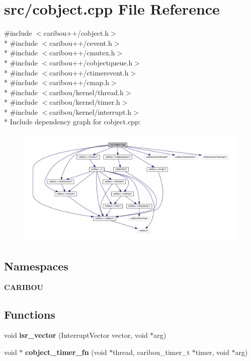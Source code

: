 \section{src/cobject.cpp File Reference}
\label{cobject_8cpp}
{\ttfamily \#include $<$caribou++/cobject.\-h$>$}\\*
{\ttfamily \#include $<$caribou++/cevent.\-h$>$}\\*
{\ttfamily \#include $<$caribou++/cmutex.\-h$>$}\\*
{\ttfamily \#include $<$caribou++/cobjectqueue.\-h$>$}\\*
{\ttfamily \#include $<$caribou++/ctimerevent.\-h$>$}\\*
{\ttfamily \#include $<$caribou++/cmap.\-h$>$}\\*
{\ttfamily \#include $<$caribou/kernel/thread.\-h$>$}\\*
{\ttfamily \#include $<$caribou/kernel/timer.\-h$>$}\\*
{\ttfamily \#include $<$caribou/kernel/interrupt.\-h$>$}\\*
Include dependency graph for cobject.\-cpp\-:\nopagebreak
\begin{figure}[H]
\begin{center}
\leavevmode
\includegraphics[width=350pt]{cobject_8cpp__incl}
\end{center}
\end{figure}
\subsection*{Namespaces}
\begin{DoxyCompactItemize}
\item 
{\bf C\-A\-R\-I\-B\-O\-U}
\end{DoxyCompactItemize}
\subsection*{Functions}
\begin{DoxyCompactItemize}
\item 
void {\bf isr\-\_\-vector} (Interrupt\-Vector vector, void $\ast$arg)
\item 
void $\ast$ {\bf cobject\-\_\-timer\-\_\-fn} (void $\ast$thread, caribou\-\_\-timer\-\_\-t $\ast$timer, void $\ast$arg)
\end{DoxyCompactItemize}
